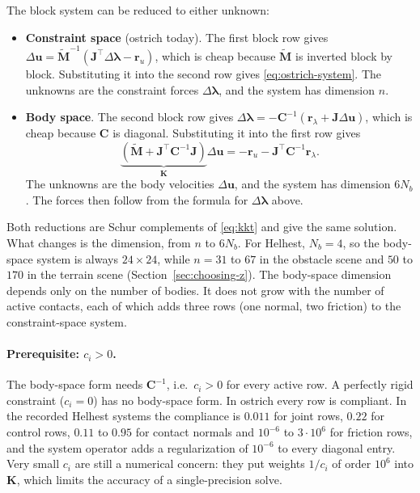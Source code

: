 The block system can be reduced to either unknown:
\begin{itemize}
  \item \textbf{Constraint space} (ostrich today). The first block row gives
    $\Delta\mathbf{u} = \tilde{\mathbf{M}}^{-1}(\mathbf{J}^\top\Delta\boldsymbol{\lambda} - \mathbf{r}_u)$,
    which is cheap because $\tilde{\mathbf{M}}$ is inverted block by block.
    Substituting it into the second row gives \eqref{eq:ostrich-system}. The
    unknowns are the constraint forces $\Delta\boldsymbol{\lambda}$, and the
    system has dimension $n$.
  \item \textbf{Body space}. The second block row gives
    $\Delta\boldsymbol{\lambda} = -\mathbf{C}^{-1}(\mathbf{r}_\lambda + \mathbf{J}\Delta\mathbf{u})$,
    which is cheap because $\mathbf{C}$ is diagonal. Substituting it into the
    first row gives
    \begin{equation}
      \underbrace{\left(\tilde{\mathbf{M}} + \mathbf{J}^\top\mathbf{C}^{-1}\mathbf{J}\right)}_{\mathbf{K}}
      \Delta\mathbf{u}
      = -\mathbf{r}_u - \mathbf{J}^\top\mathbf{C}^{-1}\mathbf{r}_\lambda .
      \label{eq:body-system}
    \end{equation}
    The unknowns are the body velocities $\Delta\mathbf{u}$, and the system
    has dimension $6N_b$. The forces then follow from the formula for
    $\Delta\boldsymbol{\lambda}$ above.
\end{itemize}
Both reductions are Schur complements of \eqref{eq:kkt} and give the same
solution. What changes is the dimension, from $n$ to $6N_b$. For Helhest,
$N_b = 4$, so the body-space system is always $24 \times 24$, while
$n = 31$ to $67$ in the obstacle scene and $50$ to $170$ in the terrain
scene (Section~\ref{sec:choosing-z}). The body-space dimension depends only
on the number of bodies. It does not grow with the number of active
contacts, each of which adds three rows (one normal, two friction) to the
constraint-space system.

\paragraph{Prerequisite: $c_i > 0$.}
The body-space form needs $\mathbf{C}^{-1}$, i.e.\ $c_i > 0$ for every
active row. A perfectly rigid constraint ($c_i = 0$) has no body-space
form. In ostrich every row is compliant. In the recorded Helhest systems the
compliance is $0.011$ for joint rows, $0.22$ for control rows, $0.11$ to
$0.95$ for contact normals and $10^{-6}$ to $3 \cdot 10^{6}$ for friction
rows, and the system operator adds a regularization of $10^{-6}$ to every
diagonal entry. Very small $c_i$ are still a numerical concern: they put
weights $1/c_i$ of order $10^{6}$ into $\mathbf{K}$, which limits the
accuracy of a single-precision solve.

